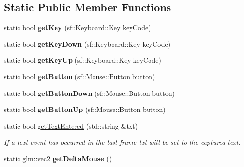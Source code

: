 \subsection*{Static Public Member Functions}
\begin{DoxyCompactItemize}
\item 
\hypertarget{class_controller_acd9b2329e852e1857a7c6d3c9478cf0d}{static bool {\bfseries get\-Key} (sf\-::\-Keyboard\-::\-Key key\-Code)}\label{class_controller_acd9b2329e852e1857a7c6d3c9478cf0d}

\item 
\hypertarget{class_controller_acd28421325f54ebf707f4befd22be9ae}{static bool {\bfseries get\-Key\-Down} (sf\-::\-Keyboard\-::\-Key key\-Code)}\label{class_controller_acd28421325f54ebf707f4befd22be9ae}

\item 
\hypertarget{class_controller_a287e959445a85c875f6104ae70e86860}{static bool {\bfseries get\-Key\-Up} (sf\-::\-Keyboard\-::\-Key key\-Code)}\label{class_controller_a287e959445a85c875f6104ae70e86860}

\item 
\hypertarget{class_controller_a541c11ba7a31bdbe031e1a98b4c8d353}{static bool {\bfseries get\-Button} (sf\-::\-Mouse\-::\-Button button)}\label{class_controller_a541c11ba7a31bdbe031e1a98b4c8d353}

\item 
\hypertarget{class_controller_a198eb526541a114f2e249b6fee645624}{static bool {\bfseries get\-Button\-Down} (sf\-::\-Mouse\-::\-Button button)}\label{class_controller_a198eb526541a114f2e249b6fee645624}

\item 
\hypertarget{class_controller_a96ce3929a258e1d00a62cc85643a98fb}{static bool {\bfseries get\-Button\-Up} (sf\-::\-Mouse\-::\-Button button)}\label{class_controller_a96ce3929a258e1d00a62cc85643a98fb}

\item 
static bool \hyperlink{class_controller_ab199b67d544a200dccc71b5f73385f74}{get\-Text\-Entered} (std\-::string \&txt)
\begin{DoxyCompactList}\small\item\em If a text event has occurred in the last frame txt will be set to the captured text. \end{DoxyCompactList}\item 
\hypertarget{class_controller_ab5d78414b0896e1d62a6a95d60db4241}{static glm\-::vec2 {\bfseries get\-Delta\-Mouse} ()}\label{class_controller_ab5d78414b0896e1d62a6a95d60db4241}

\end{DoxyCompactItemize}
